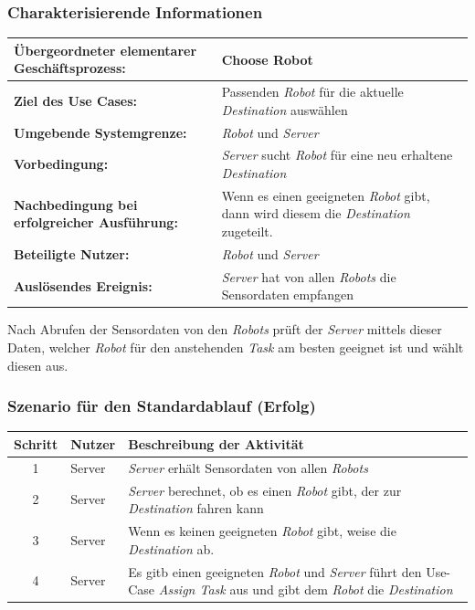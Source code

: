 			\subsubsection*{Charakterisierende Informationen}

			\begin{table}[H]
				\centering
				\begin{tabularx}{\textwidth}{|p{5cm}|X|}
				\hline
				\textbf{Übergeordneter elementarer Geschäftsprozess:} & Choose Robot \\ \hline
				\textbf{Ziel des Use Cases:} & Passenden \emph{Robot} für die aktuelle \emph{Destination} auswählen\\ \hline
				\textbf{Umgebende Systemgrenze:} & \emph{Robot} und \emph{Server} \\ \hline
				\textbf{Vorbedingung:} & \emph{Server} sucht \emph{Robot} für eine neu erhaltene \emph{Destination}\\ \hline
				\textbf{Nachbedingung bei erfolgreicher Ausführung:} & Wenn es einen geeigneten \emph{Robot} gibt, dann wird diesem die \emph{Destination} zugeteilt.\\ \hline
				\textbf{Beteiligte Nutzer:} & \emph{Robot} und \emph{Server}\\ \hline
				\textbf{Auslösendes Ereignis:} & \emph{Server} hat von allen \emph{Robots} die Sensordaten empfangen\\
				\hline
				\end{tabularx}
			\end{table}
			
			Nach Abrufen der Sensordaten von den \emph{Robots} prüft der \emph{Server} mittels dieser Daten, welcher \emph{Robot} für den anstehenden \emph{Task} am besten geeignet ist und wählt diesen aus.

			\subsubsection*{Szenario für den Standardablauf (Erfolg)}

			\begin{table}[H]
				\centering
				\begin{tabularx}{\textwidth}{|c|p{2cm}|X|}
				\hline
				Schritt & Nutzer & Beschreibung der Aktivität \\ \hline
				1 & Server & \emph{Server} erhält Sensordaten von allen \emph{Robots} \\
				2 & Server & \emph{Server} berechnet, ob es einen \emph{Robot} gibt, der zur \emph{Destination} fahren kann\\
				3 & Server & Wenn es keinen geeigneten \emph{Robot} gibt, weise die \emph{Destination} ab. \\
				4 & Server & Es gitb einen geeigneten \emph{Robot} und \emph{Server} führt den Use-Case \textit{ \glqq Assign Task \grqq } aus und gibt dem \emph{Robot} die \emph{Destination}\\
				\hline
				\end{tabularx}
			\end{table}

